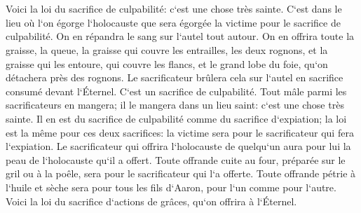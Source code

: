 \chapter{}

\verse Voici la loi du sacrifice de culpabilité: c`est une chose très sainte. 
\verse C`est dans le lieu où l`on égorge l`holocauste que sera égorgée la victime pour le sacrifice de culpabilité. On en répandra le sang sur l`autel tout autour. 
\verse On en offrira toute la graisse, la queue, la graisse qui couvre les entrailles, 
\verse les deux rognons, et la graisse qui les entoure, qui couvre les flancs, et le grand lobe du foie, qu`on détachera près des rognons. 
\verse Le sacrificateur brûlera cela sur l`autel en sacrifice consumé devant l`Éternel. C`est un sacrifice de culpabilité. 
\verse Tout mâle parmi les sacrificateurs en mangera; il le mangera dans un lieu saint: c`est une chose très sainte. 
\verse Il en est du sacrifice de culpabilité comme du sacrifice d`expiation; la loi est la même pour ces deux sacrifices: la victime sera pour le sacrificateur qui fera l`expiation. 
\verse Le sacrificateur qui offrira l`holocauste de quelqu`un aura pour lui la peau de l`holocauste qu`il a offert. 
\verse Toute offrande cuite au four, préparée sur le gril ou à la poêle, sera pour le sacrificateur qui l`a offerte. 
\verse Toute offrande pétrie à l`huile et sèche sera pour tous les fils d`Aaron, pour l`un comme pour l`autre. 
\verse Voici la loi du sacrifice d`actions de grâces, qu`on offrira à l`Éternel. 
